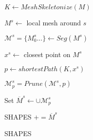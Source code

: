 \begin{algorithm}[H]
\caption{$ ShapeExtraction $}\label{alg:ext}
\begin{algorithmic}[1]


\State $K \gets MeshSkeletonize(M)$ 

\State {}
{$M^{s} \gets $ local mesh around $s$

$\mathcal{M}^{s} = \{ M^s_0 ... \} \gets Seg(M^{s})$

$x^{s} \gets$ closest point on $M^{s}$ %

$p \gets shortestPath(K,x^s)$ 

$\mathcal{M}^{s}_{p} = Prune(\mathcal{M}^{s}, p ) $

 Set $\overline M^s \gets \cup \mathcal{M}^{s}_{p} $

SHAPES $+= \overline M^s$}


\EndFor
\Return SHAPES

\EndProcedure
\end{algorithmic}
\end{algorithm}